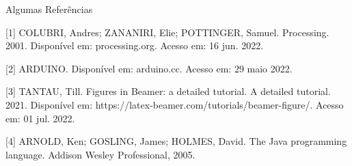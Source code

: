  \begin{frame}[t, allowframebreaks]{Algumas Referências}

  

[1] COLUBRI, Andres; ZANANIRI, Elie; POTTINGER, Samuel. Processing. 2001. Disponível em: processing.org. Acesso em: 16 jun. 2022.

[2] ARDUINO. Disponível em: arduino.cc. Acesso em: 29 maio 2022.

[3] TANTAU, Till. Figures in Beamer: a detailed tutorial. A detailed tutorial. 2021. Disponível em: https://latex-beamer.com/tutorials/beamer-figure/. Acesso em: 01 jul. 2022.

[4] ARNOLD, Ken; GOSLING, James; HOLMES, David. The Java programming language. Addison Wesley Professional, 2005.
    
     

\end{frame}
%